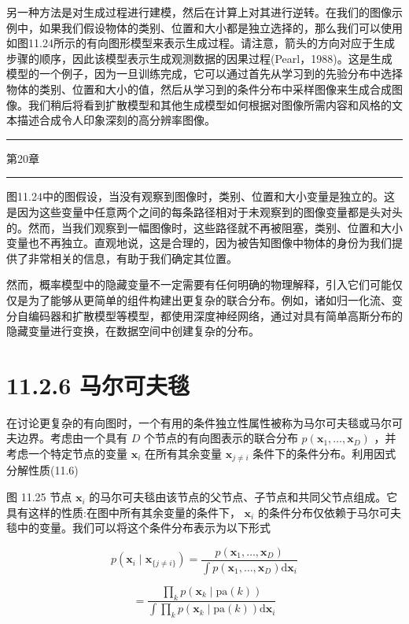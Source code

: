 \documentclass[10pt]{article}
\newcommand{\HRule}{\begin{center}\rule{0.9\linewidth}{0.2mm}\end{center}}
\begin{document}
另一种方法是对生成过程进行建模，然后在计算上对其进行逆转。在我们的图像示例中，如果我们假设物体的类别、位置和大小都是独立选择的，那么我们可以使用如图11.24所示的有向图形模型来表示生成过程。请注意，箭头的方向对应于生成步骤的顺序，因此该模型表示生成观测数据的因果过程(Pearl，1988)。这是生成模型的一个例子，因为一旦训练完成，它可以通过首先从学习到的先验分布中选择物体的类别、位置和大小的值，然后从学习到的条件分布中采样图像来生成合成图像。我们稍后将看到扩散模型和其他生成模型如何根据对图像所需内容和风格的文本描述合成令人印象深刻的高分辨率图像。

\HRule

第20章

\HRule

图11.24中的图假设，当没有观察到图像时，类别、位置和大小变量是独立的。这是因为这些变量中任意两个之间的每条路径相对于未观察到的图像变量都是头对头的。然而，当我们观察到一幅图像时，这些路径就不再被阻塞，类别、位置和大小变量也不再独立。直观地说，这是合理的，因为被告知图像中物体的身份为我们提供了非常相关的信息，有助于我们确定其位置。

然而，概率模型中的隐藏变量不一定需要有任何明确的物理解释，引入它们可能仅仅是为了能够从更简单的组件构建出更复杂的联合分布。例如，诸如归一化流、变分自编码器和扩散模型等模型，都使用深度神经网络，通过对具有简单高斯分布的隐藏变量进行变换，在数据空间中创建复杂的分布。

\section*{11.2.6 马尔可夫毯}

在讨论更复杂的有向图时，一个有用的条件独立性属性被称为马尔可夫毯或马尔可夫边界。考虑由一个具有 \(D\) 个节点的有向图表示的联合分布 \(p\left( {{\mathbf{x}}_{1},\ldots ,{\mathbf{x}}_{D}}\right)\) ，并考虑一个特定节点的变量 \({\mathbf{x}}_{i}\) 在所有其余变量 \({\mathbf{x}}_{j \neq  i}\) 条件下的条件分布。利用因式分解性质(11.6)

图 11.25 节点 \({\mathbf{x}}_{i}\) 的马尔可夫毯由该节点的父节点、子节点和共同父节点组成。它具有这样的性质:在图中所有其余变量的条件下， \({\mathbf{x}}_{i}\) 的条件分布仅依赖于马尔可夫毯中的变量。我们可以将这个条件分布表示为以下形式

\[
p\left( {{\mathbf{x}}_{i} \mid  {\mathbf{x}}_{\{ j \neq  i\} }}\right)  = \frac{p\left( {{\mathbf{x}}_{1},\ldots ,{\mathbf{x}}_{D}}\right) }{\int p\left( {{\mathbf{x}}_{1},\ldots ,{\mathbf{x}}_{D}}\right) \mathrm{d}{\mathbf{x}}_{i}}
\]

\[
= \frac{\mathop{\prod }\limits_{k}p\left( {{\mathbf{x}}_{k} \mid  \mathrm{{pa}}\left( k\right) }\right) }{\int \mathop{\prod }\limits_{k}p\left( {{\mathbf{x}}_{k} \mid  \mathrm{{pa}}\left( k\right) }\right) \mathrm{d}{\mathbf{x}}_{i}}
\]
\end{document}
